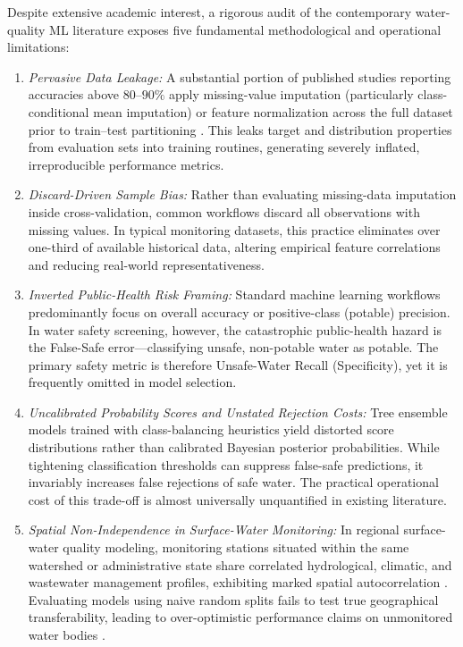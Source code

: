 \documentclass[pdflatex,sn-mathphys-num]{sn-jnl}%
\theoremstyle{thmstyleone}%
\theoremstyle{thmstyletwo}%
\theoremstyle{thmstylethree}%
\begin{document}
Despite extensive academic interest, a rigorous audit of the contemporary water-quality ML literature exposes five fundamental methodological and operational limitations:
\begin{enumerate}
    \item \textit{Pervasive Data Leakage:} A substantial portion of published studies reporting accuracies above $80$--$90\%$ apply missing-value imputation (particularly class-conditional mean imputation) or feature normalization across the full dataset prior to train--test partitioning \cite{kaufman2012,kapoor2023}. This leaks target and distribution properties from evaluation sets into training routines, generating severely inflated, irreproducible performance metrics.
    \item \textit{Discard-Driven Sample Bias:} Rather than evaluating missing-data imputation inside cross-validation, common workflows discard all observations with missing values. In typical monitoring datasets, this practice eliminates over one-third of available historical data, altering empirical feature correlations and reducing real-world representativeness.
    \item \textit{Inverted Public-Health Risk Framing:} Standard machine learning workflows predominantly focus on overall accuracy or positive-class (potable) precision. In water safety screening, however, the catastrophic public-health hazard is the False-Safe error---classifying unsafe, non-potable water as potable. The primary safety metric is therefore Unsafe-Water Recall (Specificity), yet it is frequently omitted in model selection.
    \item \textit{Uncalibrated Probability Scores and Unstated Rejection Costs:} Tree ensemble models trained with class-balancing heuristics yield distorted score distributions rather than calibrated Bayesian posterior probabilities. While tightening classification thresholds can suppress false-safe predictions, it invariably increases false rejections of safe water. The practical operational cost of this trade-off is almost universally unquantified in existing literature.
    \item \textit{Spatial Non-Independence in Surface-Water Monitoring:} In regional surface-water quality modeling, monitoring stations situated within the same watershed or administrative state share correlated hydrological, climatic, and wastewater management profiles, exhibiting marked spatial autocorrelation \cite{legendre1993,roberts2017,ploton2020}. Evaluating models using naive random splits fails to test true geographical transferability, leading to over-optimistic performance claims on unmonitored water bodies \cite{meyer2018}.
\end{enumerate}
\end{document}
